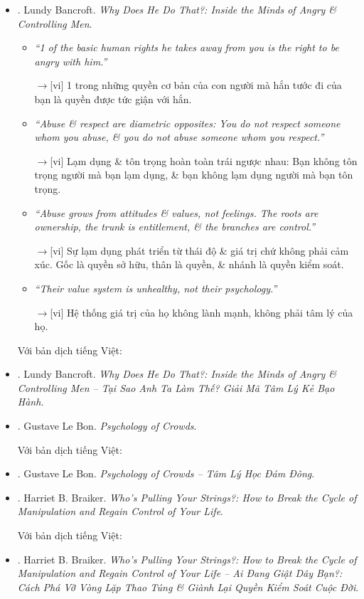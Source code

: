 \documentclass[12pt,twoside]{book}
\begin{document}
\begin{itemize}
	\item \cite{Bancroft_why_he_do}. {\sc Lundy Bancroft}. {\it Why Does He Do That?: Inside the Minds of Angry \& Controlling Men}.
	\begin{itemize}
		\item {\it``1 of the basic human rights he takes away from you is the right to be angry with him.''}
		
		{\sf[en]$\to$[vi]} 1 trong những quyền cơ bản của con người mà hắn tước đi của bạn là quyền được tức giận với hắn.
		
		\item {\it``Abuse \& respect are diametric opposites: You do not respect someone whom you abuse, \& you do not abuse someone whom you respect.''}
		
		{\sf[en]$\to$[vi]} Lạm dụng \& tôn trọng hoàn toàn trái ngược nhau: Bạn không tôn trọng người mà bạn lạm dụng, \& bạn không lạm dụng người mà bạn tôn trọng.
		
		\item {\it``Abuse grows from attitudes \& values, not feelings. The roots are ownership, the trunk is entitlement, \& the branches are control.''}
			
		{\sf[en]$\to$[vi]} Sự lạm dụng phát triển từ thái độ \& giá trị chứ không phải cảm xúc. Gốc là quyền sở hữu, thân là quyền, \& nhánh là quyền kiểm soát.
		
		\item {\it``Their value system is unhealthy, not their psychology.''}
		
		{\sf[en]$\to$[vi]} Hệ thống giá trị của họ không lành mạnh, không phải tâm lý của họ.
	\end{itemize}
	Với bản dịch tiếng Việt:
	\item \cite{Bancroft_why_he_do_VN}. {\sc Lundy Bancroft}. {\it Why Does He Do That?: Inside the Minds of Angry \& Controlling Men -- Tại Sao Anh Ta Làm Thế? Giải Mã Tâm Lý Kẻ Bạo Hành}.
	\item \cite{Bon_crowd_psychology}. {\sc Gustave Le Bon}. {\it Psychology of Crowds}.
	
	Với bản dịch tiếng Việt:
	\item \cite{Bon_crowd_psychology_VN}. {\sc Gustave Le Bon}. {\it Psychology of Crowds -- Tâm Lý Học Đám Đông}.
	\item \cite{Braiker_string}. {\sc Harriet B. Braiker}. {\it Who's Pulling Your Strings?: How to Break the Cycle of Manipulation and Regain Control of Your Life}.
	
	Với bản dịch tiếng Việt:
	\item \cite{Braiker_string}. {\sc Harriet B. Braiker}. {\it Who's Pulling Your Strings?: How to Break the Cycle of Manipulation and Regain Control of Your Life -- Ai Đang Giật Dây Bạn?: Cách Phá Vỡ Vòng Lặp Thao Túng \& Giành Lại Quyền Kiểm Soát Cuộc Đời}.
\end{itemize}
\end{document}
